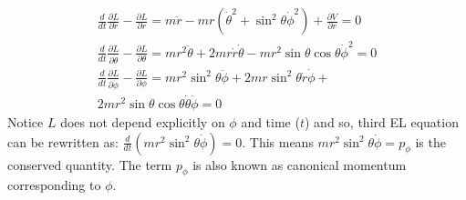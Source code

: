 \documentclass[conference]{IEEEtran}
\begin{document}
\begin{equation}
\begin{array}{l}
\frac{d}{d t} \frac{\partial L}{\partial \dot{r}}-\frac{\partial L}{\partial r}=m \ddot{r}-m r\left(\dot{\theta}^{2}+\sin ^{2} \theta \dot{\phi}^{2}\right)+\frac{\partial V}{\partial r}=0 \\
\frac{d}{d t} \frac{\partial L}{\partial \dot{\theta}}-\frac{\partial L}{\partial \theta}=m r^{2} \ddot{\theta}+2 m r \dot{r} \dot{\theta}-m r^{2} \sin \theta \cos \theta \dot{\phi}^{2}=0\\
\frac{d}{d t} \frac{\partial L}{\partial \dot{\phi}}-\frac{\partial L}{\partial \phi}=m r^{2} \sin ^{2} \theta \ddot{\phi}+ 2 m r \sin ^{2} \theta \dot{r} \dot{\phi}+ \\ 2 m r^{2} \sin \theta \cos \theta \dot{\theta} \dot{\phi}=0
\end{array}
\end{equation}
Notice $L$ does not depend explicitly on $\phi$ and time ($t$) and so, third EL equation can be rewritten as:
$\frac{d}{d t}\left(mr^{2}\sin^{2}\theta \dot{\phi}\right) = 0$. This means $mr^{2}\sin^{2}\theta \dot{\phi} = p_{\phi}$ is the conserved quantity. The term $p_{\phi}$ is also known as canonical momentum corresponding to $\phi$.
\vspace{1em}
\end{document}
